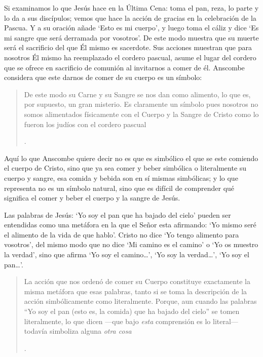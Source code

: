 Si examinamos lo que Jesús hace en la Última Cena: toma el pan, reza, lo parte y lo da a sus discípulos; vemos que hace la acción de gracias en la celebración de la Pascua. Y a su oración añade \enquote*{Esto es mi cuerpo}, y luego toma el cáliz y dice \enquote*{Es mi sangre que será derramada por vosotros}. De este modo muestra que su muerte será el sacrificio del que Él mismo es sacerdote. Sus acciones muestran que para nosotros Él mismo ha reemplazado el cordero pascual, asume el lugar del cordero que se ofrece en sacrificio de comunión al invitarnos a comer de él. Anscombe considera que este darnos de comer de su cuerpo es un símbolo: \blockquote[{\Cite[91]{torralbaynubiola2005fayeh:ot}}.
]{De este modo su Carne y su Sangre se nos dan como alimento, lo que es, por supuesto, un gran misterio. Es claramente un símbolo pues nosotros no somos alimentados físicamente con el Cuerpo y la Sangre de Cristo como lo fueron los judíos con el cordero pascual}. Aquí lo que Anscombe quiere decir no es que es simbólico el que se este comiendo el cuerpo de Cristo, sino que ya sea comer y beber simbólica o literalmente su cuerpo y sangre, esa comida y bebida son en sí mismas simbólicas; y lo que representa no es un símbolo natural, sino que es difícil de comprender qué significa el comer y beber el cuerpo y la sangre de Jesús.

Las palabras de Jesús: \enquote*{Yo soy el pan que ha bajado del cielo} pueden ser entendidas como una metáfora en la que el Señor esta afirmando: \enquote*{Yo mismo seré el alimento de la vida de que hablo}. Cristo no dice \enquote*{Yo tengo alimento para vosotros}, del mismo modo que no dice \enquote*{Mi camino es el camino} o \enquote*{Yo os muestro la verdad}, sino que afirma \enquote*{Yo soy el camino\ldots}, \enquote*{Yo soy la verdad\ldots}, \enquote*{Yo soy el pan\ldots}. \blockquote[{\Cite[93]{torralbaynubiola2005fayeh:ot}}.
]{La acción que nos ordenó de comer su Cuerpo constituye exactamente la misma metáfora que esas palabras, tanto si se toma la descripción de la acción simbólicamente como literalmente. Porque, aun cuando las palabras ``Yo soy el pan (esto es, la comida) que ha bajado del cielo'' se tomen literalmente, lo que dicen ---que bajo \emph{esta} comprensión es lo literal--- todavía simboliza alguna \emph{otra cosa}}.

